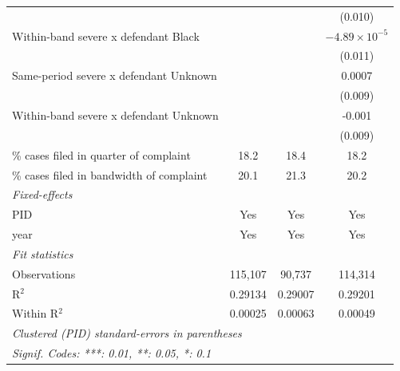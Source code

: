 \begin{tabular}{lccc}
                                                      &                        &               & (0.010)\\   
   Within-band severe x defendant Black               &                        &               & $-4.89\times 10^{-5}$\\    
                                                      &                        &               & (0.011)\\   
   Same-period severe x defendant Unknown             &                        &               & 0.0007\\   
                                                      &                        &               & (0.009)\\   
   Within-band severe x defendant Unknown             &                        &               & -0.001\\   
                                                      &                        &               & (0.009)\\   
   \% cases filed in quarter of complaint             & 18.2                   & 18.4          & 18.2\\  
   \% cases filed in bandwidth of complaint           & 20.1                   & 21.3          & 20.2\\  
   \midrule
   \emph{Fixed-effects}\\
   PID                                                & Yes                    & Yes           & Yes\\  
   year                                               & Yes                    & Yes           & Yes\\  
   \midrule
   \emph{Fit statistics}\\
   Observations                                       & 115,107                & 90,737        & 114,314\\  
   R$^2$                                              & 0.29134                & 0.29007       & 0.29201\\  
   Within R$^2$                                       & 0.00025                & 0.00063       & 0.00049\\  
   \midrule \midrule
   \multicolumn{4}{l}{\emph{Clustered (PID) standard-errors in parentheses}}\\
   \multicolumn{4}{l}{\emph{Signif. Codes: ***: 0.01, **: 0.05, *: 0.1}}\\
\end{tabular}
\par\endgroup
